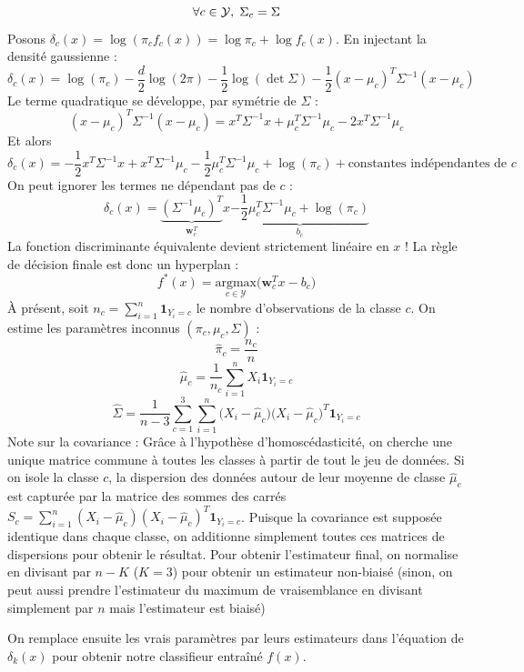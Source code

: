 \documentclass[a4paper,11pt]{paper}
\theoremstyle{plain}
\theoremstyle{definition}
\theoremstyle{remark}
\begin{document}
$$\forall c \in \mathcal Y, \hspace{0.1cm} \Sigma_c = \Sigma$$
Posons $\delta_c (x) = \log(\pi_c f_c(x)) = \log \pi_c + \log f_c(x)$. En injectant la densité gaussienne :
$$\delta_c(x) = \log(\pi_c) - \frac{d}{2}\log(2\pi) - \frac{1}{2}\log(\det \Sigma) - \frac{1}{2} (x - \mu_c)^T \Sigma^{-1} (x - \mu_c)$$
Le terme quadratique se développe, par symétrie de $\Sigma$ :
$$(x- \mu_c)^T \Sigma^{-1}(x- \mu_c) =  x^T \Sigma^{-1} x + \mu_c^T \Sigma^{-1} \mu_c - 2x^T\Sigma^{-1}\mu_c$$
Et alors
$$\delta_c(x) = -\frac{1}{2} x^T \Sigma^{-1} x + x^T \Sigma^{-1} \mu_c - \frac{1}{2} \mu_c^T \Sigma^{-1} \mu_c + \log(\pi_c) + \text{constantes indépendantes de } c$$
On peut ignorer les termes ne dépendant pas de $c$ :
$$\delta_c(x) = \underbrace{( \Sigma^{-1} \mu_c )^T}_{\mathbf{w}_c^T} x \underbrace{- \frac{1}{2} \mu_c^T \Sigma^{-1} \mu_c+ \log(\pi_c)}_{b_c}$$
La fonction discriminante équivalente devient strictement linéaire en $x$ ! La règle de décision finale est donc un hyperplan :
$$f^*(x) = \underset{c \in \mathcal Y}{\text{argmax}}\big(\textbf{w}_c^T x - b_c\big)$$
À présent, soit $n_c = \displaystyle \sum_{i=1}^n \mathbf 1_{Y_i = c}$ le nombre d'observations de la classe $c$. On estime les paramètres inconnus $(\pi_c, \mu_c, \Sigma)$ :
$$\hat \pi_c = \dfrac{n_c}{n}$$
$$\hat \mu_c = \dfrac{1}{n_c}\sum_{i=1}^n X_i \mathbf 1_{Y_i = c}$$
$$\hat \Sigma = \dfrac{1}{n-3}\sum_{c=1}^3 \sum_{i=1}^n \big( X_i - \hat \mu_c\big)\big( X_i - \hat \mu_c\big)^T \mathbf 1_{Y_i = c}$$
Note sur la covariance : Grâce à l'hypothèse d'homoscédasticité, on cherche une unique matrice commune à toutes les classes à partir de tout le jeu de données. Si on isole la classe $c$, la dispersion des données autour de leur moyenne de classe $\hat \mu_c$ est capturée par la matrice des sommes des carrés $\displaystyle S_c = \sum_{i=1}^n (X_i - \hat \mu_c)(X_i - \hat \mu_c)^T \mathbf 1_{Y_i = c}$. Puisque la covariance est supposée identique dans chaque classe, on additionne simplement toutes ces matrices de dispersions pour obtenir le résultat. Pour obtenir l'estimateur final, on normalise en divisant par $n - K$ ($K = 3$) pour obtenir un estimateur non-biaisé (sinon, on peut aussi prendre l'estimateur du maximum de vraisemblance en divisant simplement par $n$ mais l'estimateur est biaisé)

On remplace ensuite les vrais paramètres par leurs estimateurs dans l'équation de $\delta_k(x)$ pour obtenir notre classifieur entraîné $f(x)$.

\newpage
\end{document}
